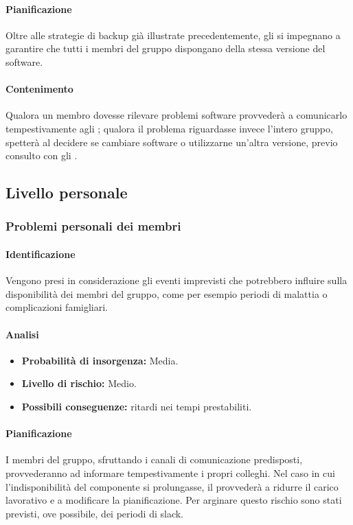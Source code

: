 \paragraph {Pianificazione}
Oltre alle strategie di backup già illustrate precedentemente, gli \adms{} si impegnano a garantire che tutti i membri del gruppo dispongano della stessa versione del software.

\paragraph {Contenimento}
Qualora un membro dovesse rilevare problemi software provvederà a comunicarlo tempestivamente agli \adms{}; qualora il problema riguardasse invece l'intero gruppo, spetterà al \RdP{} decidere se cambiare software o utilizzarne un'altra versione, previo consulto con gli \adms{}.

\subsection{Livello personale}
\subsubsection{Problemi personali dei membri}
\paragraph {Identificazione}
Vengono presi in considerazione gli eventi imprevisti che potrebbero influire sulla disponibilità dei membri del gruppo, come per esempio periodi di malattia o complicazioni famigliari.

\paragraph {Analisi}
\begin{itemize}
	\item \textbf{Probabilità di insorgenza:} Media.
	\item \textbf{Livello di rischio:} Medio.
	\item \textbf{Possibili conseguenze:} ritardi nei tempi prestabiliti.
\end{itemize}

\paragraph {Pianificazione}
I membri del gruppo, sfruttando i canali di comunicazione predisposti, provvederanno ad informare tempestivamente i propri colleghi. Nel caso in cui l'indisponibilità del componente si prolungasse, il \RdP{} provvederà a ridurre il carico lavorativo e a modificare la pianificazione. Per arginare questo rischio sono stati previsti, ove possibile, dei periodi di slack.

